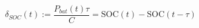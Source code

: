 \begin{equation}
\delta_{SOC}(t) := \frac{P_{bat}(t)\tau}{C} = \text{SOC}(t) - \text{SOC}(t-\tau)
\end{equation}
